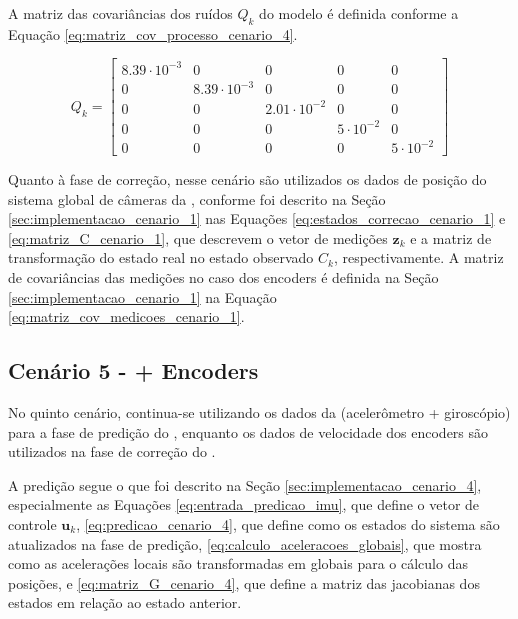 \documentclass[acronym, symbols, table]{fei}
\begin{document}
			A matriz das covariâncias dos ruídos $Q_{k}$ do modelo é definida conforme a Equação \eqref{eq:matriz_cov_processo_cenario_4}.
		
			\begin{equation}\label{eq:matriz_cov_processo_cenario_4}
				Q_{k} = \begin{bmatrix}
					8.39\cdot10^{-3} & 0 & 0 & 0 & 0 \\
					0 & 8.39\cdot10^{-3} & 0 & 0 & 0 \\
					0 & 0 & 2.01\cdot10^{-2} & 0 & 0 \\
					0 & 0 & 0 & 5\cdot10^{-2} & 0 \\
					0 & 0 & 0 & 0 & 5\cdot10^{-2}
				\end{bmatrix}
			\end{equation}

			 Quanto à fase de correção, nesse cenário são utilizados os dados de posição do sistema global de câmeras da , conforme foi descrito na Seção \ref{sec:implementacao_cenario_1} nas Equações \eqref{eq:estados_correcao_cenario_1} e \eqref{eq:matriz_C_cenario_1}, que descrevem o vetor de medições $\textbf{z}_{k}$ e a matriz de transformação do estado real no estado observado $C_{k}$, respectivamente. A matriz de covariâncias das medições no caso dos encoders é definida na Seção \ref{sec:implementacao_cenario_1} na Equação \eqref{eq:matriz_cov_medicoes_cenario_1}.
		
		\subsection{Cenário 5 -  + Encoders} \label{sec:implementacao_cenario_5}
			
			No quinto cenário, continua-se utilizando os dados da  (acelerômetro + giroscópio) para a fase de predição do , enquanto os dados de velocidade dos encoders são utilizados na fase de correção do .
			
			A predição segue o que foi descrito na Seção \ref{sec:implementacao_cenario_4}, especialmente as Equações \eqref{eq:entrada_predicao_imu}, que define o vetor de controle $\textbf{u}_k$, \eqref{eq:predicao_cenario_4}, que define como os estados do sistema são atualizados na fase de predição, \eqref{eq:calculo_aceleracoes_globais}, que mostra como as acelerações locais são transformadas em globais para o cálculo das posições, e \eqref{eq:matriz_G_cenario_4}, que define a matriz das jacobianas dos estados em relação ao estado anterior.
	
\end{document}
